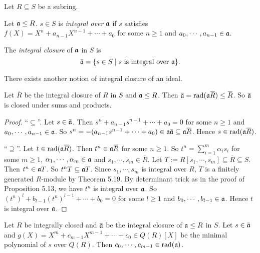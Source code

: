 \noindent Let $R \subseteq S$ be a subring.

\begin{definition}
    Let $\mathfrak{a} \leq R$. $s \in S$ is \emph{integral over $\mathfrak{a}$} if $s$ satisfies $f(X) = X^{n} + a_{n-1}X^{n-1} + \cdots + a_0$ for some $n \geq 1$ and $a_0,\cdots,a_{n-1} \in \mathfrak{a}$. \par 
    The \emph{integral closure} of $\mathfrak{a}$ in $S$ is 
    \[\overbar{\ffa} = \{s \in S \mid s \text{ is integral over $\ffa$}\}.\]
\end{definition}

\begin{warning}
    There exists another notion of integral closure of an ideal.
\end{warning}

\begin{lemma}
    Let $\overbar{R}$ be the integral closure of $R$ in $S$ and $\mathfrak{a} \leq R$. Then $\overbar{\ffa} = \operatorname{rad}(\ffa \overbar{R}) \leq \overbar{R}$. So $\overbar{\ffa}$ is closed under sums and products.
\end{lemma}

\begin{proof}
    ``$\subseteq$''. Let $s \in \overbar{\ffa}$. Then $s^{n} + a_{n-1}s^{n-1} + \cdots + a_0 = 0$ for some $n \geq 1$ and $a_0,\cdots,a_{n-1} \in \mathfrak{a}$. So $s^{n} = -(a_{n-1}s^{n-1} + \cdots + a_0) \in \ffa \overbar{\ffa} \subseteq \ffa \overbar{R}$. Hence $s \in \operatorname{rad}(\ffa \overbar{R})$. \par 
    ``$\supseteq$''. Let $t \in \operatorname{rad}(\ffa \overbar{R})$. Then $t^{n} \in \ffa \overbar{R}$ for some $n \geq 1$. So $t^{n} = \sum_{i=1}^{m} \alpha_is_i$ for some $m \geq 1$, $\alpha_1,\cdots,\alpha_m \in \mathfrak{a}$ and $s_1,\cdots,s_m \in \overbar{R}$. Let $T := R[s_1,\cdots,s_m] \subseteq \overbar{R} \subseteq S$. Then $t^{n} \in \mathfrak{a} T$. So $t^{n}T \subseteq \mathfrak{a} T$. Since $s_1,\cdots,s_m$ is integral over $R$, $T$ is a finitely generated $R$-module by Theorem 5.19. By determinant trick as in the proof of Proposition 5.13, we have $t^{n}$ is integral over $\mathfrak{a}$. So $(t^{n})^{l} + b_{l-1}(t^{n})^{l-1} + \cdots + b_0 = 0$ for some $l \geq 1$ and $b_0,\cdots,b_{l-1} \in \mathfrak{a}$. Hence $t$ is integral over $\mathfrak{a}$.
\end{proof}

\begin{proposition}
    Let $R$ be integrally closed and $\overbar{\ffa}$ be the integral closure of $\mathfrak{a} \leq R$ in $S$. Let $s \in \overbar{\ffa}$ and $g(X) = X^{m} + c_{m-1}X^{m-1} + \cdots + c_0 \in Q(R)[X]$ be the minimal polynomial of $s$ over $Q(R)$. Then $c_0,\cdots,c_{m-1} \in \operatorname{rad}(\mathfrak{a})$.
\end{proposition}

